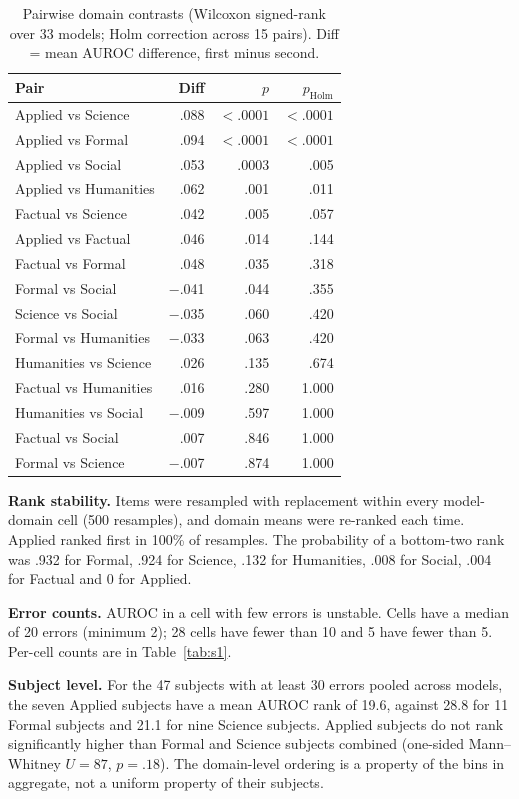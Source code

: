 \begin{table}[!htbp]
\centering
\caption{Pairwise domain contrasts (Wilcoxon signed-rank over 33 models; Holm correction across 15 pairs). Diff = mean AUROC difference, first minus second.}
\label{tab:pairs}
\small
\begin{tabular}{lrrr}
\toprule
\textbf{Pair} & \textbf{Diff} & \textbf{$p$} & \textbf{$p_{\text{Holm}}$} \\
\midrule
Applied vs Science & .088 & $<.0001$ & $<.0001$ \\
Applied vs Formal & .094 & $<.0001$ & $<.0001$ \\
Applied vs Social & .053 & .0003 & .005 \\
Applied vs Humanities & .062 & .001 & .011 \\
Factual vs Science & .042 & .005 & .057 \\
Applied vs Factual & .046 & .014 & .144 \\
Factual vs Formal & .048 & .035 & .318 \\
Formal vs Social & $-$.041 & .044 & .355 \\
Science vs Social & $-$.035 & .060 & .420 \\
Formal vs Humanities & $-$.033 & .063 & .420 \\
Humanities vs Science & .026 & .135 & .674 \\
Factual vs Humanities & .016 & .280 & 1.000 \\
Humanities vs Social & $-$.009 & .597 & 1.000 \\
Factual vs Social & .007 & .846 & 1.000 \\
Formal vs Science & $-$.007 & .874 & 1.000 \\
\bottomrule
\end{tabular}
\end{table}

\textbf{Rank stability.} Items were resampled with replacement within every model-domain cell (500 resamples), and domain means were re-ranked each time. Applied ranked first in 100\% of resamples. The probability of a bottom-two rank was .932 for Formal, .924 for Science, .132 for Humanities, .008 for Social, .004 for Factual and 0 for Applied.

\textbf{Error counts.} AUROC in a cell with few errors is unstable. Cells have a median of 20 errors (minimum 2); 28 cells have fewer than 10 and 5 have fewer than 5. Per-cell counts are in Table~\ref{tab:s1}.

\textbf{Subject level.} For the 47 subjects with at least 30 errors pooled across models, the seven Applied subjects have a mean AUROC rank of 19.6, against 28.8 for 11 Formal subjects and 21.1 for nine Science subjects. Applied subjects do not rank significantly higher than Formal and Science subjects combined (one-sided Mann--Whitney $U = 87$, $p = .18$). The domain-level ordering is a property of the bins in aggregate, not a uniform property of their subjects.

